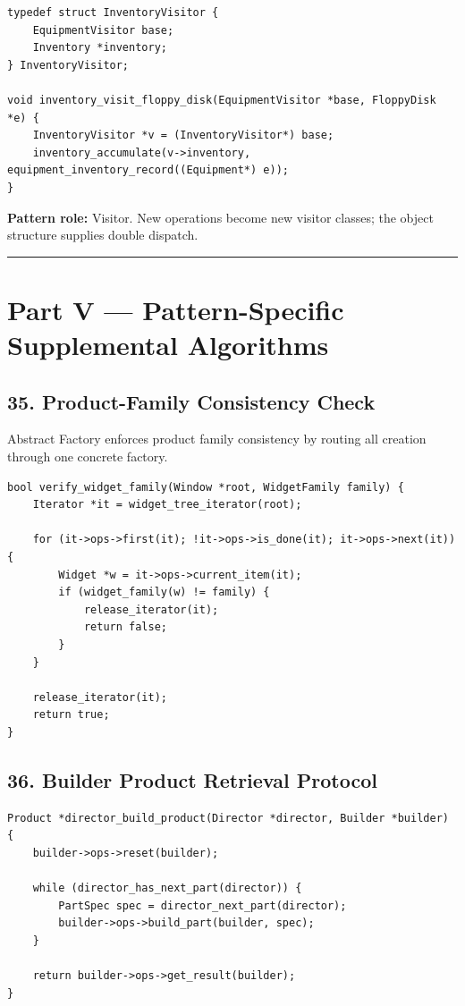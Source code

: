 \documentclass[11pt]{article}
\begin{document}
\begin{verbatim}
typedef struct InventoryVisitor {
    EquipmentVisitor base;
    Inventory *inventory;
} InventoryVisitor;

void inventory_visit_floppy_disk(EquipmentVisitor *base, FloppyDisk *e) {
    InventoryVisitor *v = (InventoryVisitor*) base;
    inventory_accumulate(v->inventory, equipment_inventory_record((Equipment*) e));
}
\end{verbatim}

\textbf{Pattern role:} Visitor. New operations become new visitor classes; the object structure supplies double dispatch.

\begin{center}\rule{0.5\linewidth}{0.5pt}\end{center}

\section{Part V --- Pattern-Specific Supplemental Algorithms}\label{part-v-pattern-specific-supplemental-algorithms}

\subsection{35. Product-Family Consistency Check}\label{product-family-consistency-check}

Abstract Factory enforces product family consistency by routing all creation through one concrete factory.

\begin{verbatim}
bool verify_widget_family(Window *root, WidgetFamily family) {
    Iterator *it = widget_tree_iterator(root);

    for (it->ops->first(it); !it->ops->is_done(it); it->ops->next(it)) {
        Widget *w = it->ops->current_item(it);
        if (widget_family(w) != family) {
            release_iterator(it);
            return false;
        }
    }

    release_iterator(it);
    return true;
}
\end{verbatim}

\subsection{36. Builder Product Retrieval Protocol}\label{builder-product-retrieval-protocol}

\begin{verbatim}
Product *director_build_product(Director *director, Builder *builder) {
    builder->ops->reset(builder);

    while (director_has_next_part(director)) {
        PartSpec spec = director_next_part(director);
        builder->ops->build_part(builder, spec);
    }

    return builder->ops->get_result(builder);
}
\end{verbatim}
\end{document}
